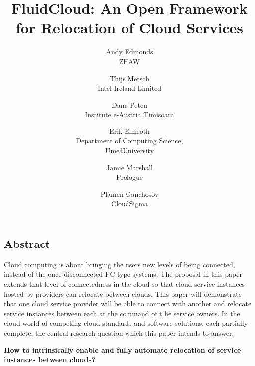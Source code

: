 \documentclass[letterpaper,twocolumn,10pt]{article}
\begin{document}
\date{}

\title{\Large \bf FluidCloud: An Open Framework for Relocation of Cloud Services}

\author{
{\rm Andy Edmonds}\\
ZHAW
\and
{\rm Thijs Metsch}\\
Intel Ireland Limited
\and
{\rm Dana Petcu}\\
Institute e-Austria Timisoara
\and
{\rm Erik Elmroth}\\
Department of Computing Science,\\Ume\aa  University
\and
{\rm Jamie Marshall}\\
Prologue
\and
{\rm Plamen Ganchosov}\\
CloudSigma
}

\maketitle


\subsection*{Abstract}

Cloud computing is about bringing the users new levels of being connected, 
instead of the once disconnected PC type systems. The proposal in this paper extends 
that level of connectedness in the cloud so that cloud service instances 
hosted by providers can relocate between clouds. This paper will 
demonstrate that one cloud service provider will be able to connect with 
another and relocate service instances between each at the command of t
he service owners. In the cloud world of competing cloud standards and 
software solutions, each partially complete, the central research question which this paper intends to answer:

\textbf{How to intrinsically enable and fully automate relocation of service instances between clouds?}
\end{document}
